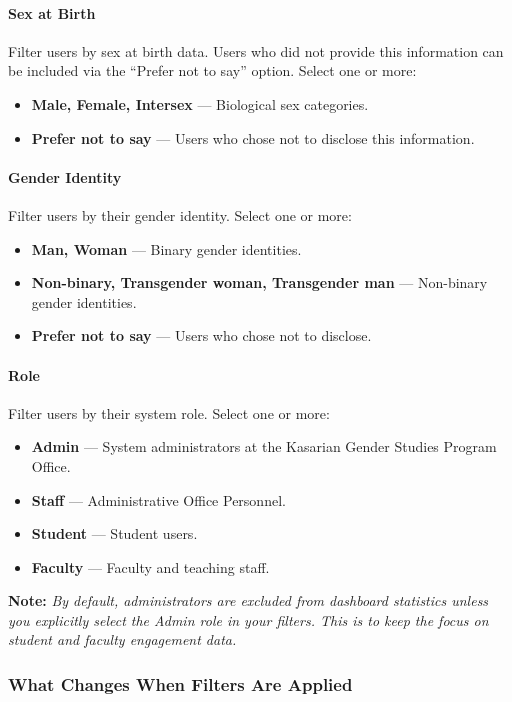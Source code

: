 \documentclass[12pt, a4paper]{article}
\begin{document}
\paragraph{Sex at Birth}
Filter users by sex at birth data. Users who did not provide this information can be included via the ``Prefer not to say'' option. Select one or more:
\begin{itemize}[leftmargin=1.5em]
  \item \textbf{Male, Female, Intersex} — Biological sex categories.
  \item \textbf{Prefer not to say} — Users who chose not to disclose this information.
\end{itemize}

\paragraph{Gender Identity}
Filter users by their gender identity. Select one or more:
\begin{itemize}[leftmargin=1.5em]
  \item \textbf{Man, Woman} — Binary gender identities.
  \item \textbf{Non-binary, Transgender woman, Transgender man} — Non-binary gender identities.
  \item \textbf{Prefer not to say} — Users who chose not to disclose.
\end{itemize}

\paragraph{Role}
Filter users by their system role. Select one or more:
\begin{itemize}[leftmargin=1.5em]
  \item \textbf{Admin} — System administrators at the Kasarian Gender Studies Program Office.
  \item \textbf{Staff} — Administrative Office Personnel.
  \item \textbf{Student} — Student users.
  \item \textbf{Faculty} — Faculty and teaching staff.
\end{itemize}

\textbf{Note:} \textit{By default, administrators are excluded from dashboard statistics unless you explicitly select the Admin role in your filters. This is to keep the focus on student and faculty engagement data.}

\subsubsection{What Changes When Filters Are Applied}
\end{document}
